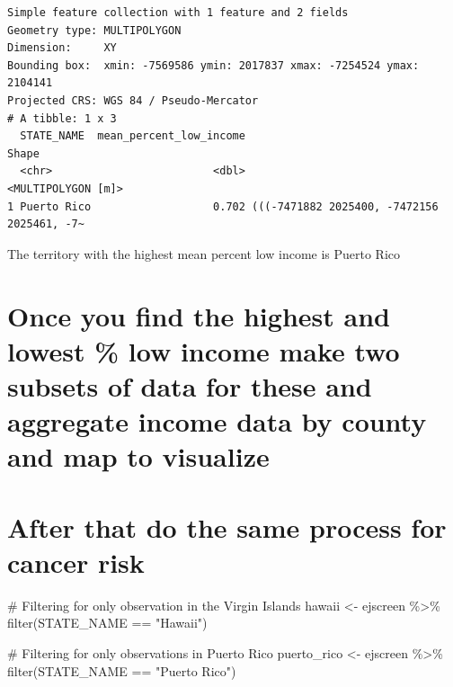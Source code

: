 \documentclass[
  letterpaper,
  DIV=11,
  numbers=noendperiod]{scrartcl}
\newenvironment{Shaded}{\begin{snugshade}}{\end{snugshade}}
\newcommand{\CommentTok}[1]{\textcolor[rgb]{0.37,0.37,0.37}{#1}}
\newcommand{\FunctionTok}[1]{\textcolor[rgb]{0.28,0.35,0.67}{#1}}
\newcommand{\NormalTok}[1]{\textcolor[rgb]{0.00,0.23,0.31}{#1}}
\newcommand{\OtherTok}[1]{\textcolor[rgb]{0.00,0.23,0.31}{#1}}
\newcommand{\SpecialCharTok}[1]{\textcolor[rgb]{0.37,0.37,0.37}{#1}}
\newcommand{\StringTok}[1]{\textcolor[rgb]{0.13,0.47,0.30}{#1}}
\begin{document}
\begin{verbatim}
Simple feature collection with 1 feature and 2 fields
Geometry type: MULTIPOLYGON
Dimension:     XY
Bounding box:  xmin: -7569586 ymin: 2017837 xmax: -7254524 ymax: 2104141
Projected CRS: WGS 84 / Pseudo-Mercator
# A tibble: 1 x 3
  STATE_NAME  mean_percent_low_income                                      Shape
  <chr>                         <dbl>                         <MULTIPOLYGON [m]>
1 Puerto Rico                   0.702 (((-7471882 2025400, -7472156 2025461, -7~
\end{verbatim}

The territory with the highest mean percent low income is Puerto Rico

\section{Once you find the highest and lowest \% low income make two
subsets of data for these and aggregate income data by county and map to
visualize}\label{once-you-find-the-highest-and-lowest-low-income-make-two-subsets-of-data-for-these-and-aggregate-income-data-by-county-and-map-to-visualize}

\section{After that do the same process for cancer
risk}\label{after-that-do-the-same-process-for-cancer-risk}

\begin{Shaded}
\begin{Highlighting}[]
\CommentTok{\# Filtering for only observation in the Virgin Islands}
\NormalTok{hawaii }\OtherTok{\textless{}{-}}\NormalTok{ ejscreen }\SpecialCharTok{\%\textgreater{}\%}
  \FunctionTok{filter}\NormalTok{(STATE\_NAME }\SpecialCharTok{==} \StringTok{"Hawaii"}\NormalTok{) }
\end{Highlighting}
\end{Shaded}

\begin{Shaded}
\begin{Highlighting}[]
\CommentTok{\# Filtering for only observations in Puerto Rico}
\NormalTok{puerto\_rico }\OtherTok{\textless{}{-}}\NormalTok{ ejscreen }\SpecialCharTok{\%\textgreater{}\%}
  \FunctionTok{filter}\NormalTok{(STATE\_NAME }\SpecialCharTok{==} \StringTok{"Puerto Rico"}\NormalTok{) }
\end{Highlighting}
\end{Shaded}
\end{document}
